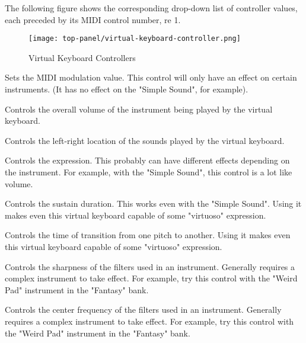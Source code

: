       The following figure shows the corresponding drop-down list of controller
      values, each preceded by its MIDI control number, re 1.

\begin{figure}[H]
   \centering
   \texttt{[image: top-panel/virtual-keyboard-controller.png]}
   \caption{Virtual Keyboard Controllers}
   \label{fig:virtual_keyboard_controllers}
\end{figure}

   \setcounter{ItemCounter}{0}      %

   Sets the MIDI modulation value.  This control will
   only have an effect on certain instruments.  (It has no effect on the
   "Simple Sound", for example).

   Controls the overall volume of the instrument being played by the virtual
   keyboard.

   Controls the left-right location of the sounds played by the virtual
   keyboard.

   Controls the expression.  This probably can have different effects depending
   on the instrument.  For example, with the "Simple Sound", this control is a
   lot like volume.

   Controls the sustain duration.  This works even with the "Simple Sound".
   Using it makes even this virtual keyboard capable of some "virtuoso"
   expression.

   Controls the time of transition from one pitch to another.
   Using it makes even this virtual keyboard capable of some "virtuoso"
   expression.

   Controls the sharpness of the filters used in an instrument.
   Generally requires a complex instrument to take effect.
   For example, try this control with the "Weird Pad" instrument in the
   "Fantasy" bank.

   Controls the center frequency of the filters used in an instrument.
   Generally requires a complex instrument to take effect.
   For example, try this control with the "Weird Pad" instrument in the
   "Fantasy" bank.

